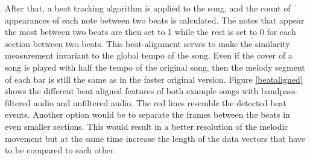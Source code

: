 \noindent After that, a beat tracking algorithm is applied to the song, and the count of appearances of each note between two beats is calculated. The notes that appear the most between two beats are then set to 1 while the rest is set to 0 for each section between two beats. This beat-alignment serves to make the similarity measurement invariant to the global tempo of the song. Even if the cover of a song is played with half the tempo of the original song, then the melody segment of each bar is still the same as in the faster original version.
Figure \ref{beataligned} shows the different beat aligned features of both example songs with bandpass-filtered audio and unfiltered audio. The red lines resemble the detected beat events.
Another option would be to separate the frames between the beats in even smaller sections. This would result in a better resolution of the melodic movement but at the same time increase the length of the data vectors that have to be compared to each other.
